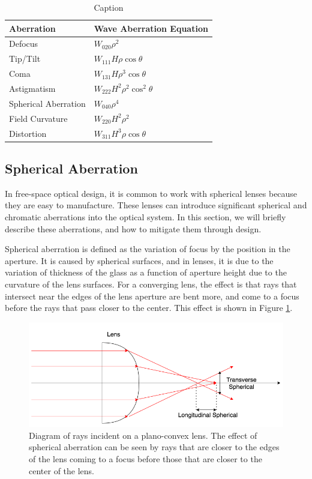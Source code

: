 \begin{table}
	\begin{center}
		\begin{tabular}{ | l| l | }
			\hline
			\textbf{Aberration}& \textbf{Wave Aberration Equation} \\ \hline
			Defocus & $W_{020}\rho^2$\\ \hline
			Tip/Tilt & $W_{111}H\rho \cos\theta$ \\ \hline
			Coma & $W_{131}H\rho^3\cos\theta$  \\ \hline
			Astigmatism & $W_{222}H^2\rho^2\cos^2\theta$  \\ \hline
			Spherical Aberration & $W_{040}\rho^4$ \\ \hline
			Field Curvature & $W_{220}H^2\rho^2$ \\ \hline
			Distortion & $W_{311}H^3 \rho \cos\theta$ \\ \hline
				
		\end{tabular}
	\end{center}
	\caption{Caption}
	\label{tab:aberrations}
\end{table}



\subsection{Spherical Aberration}

In free-space optical design, it is common to work with spherical lenses because they are easy to manufacture. These lenses can introduce significant spherical and chromatic aberrations into the optical system. In this section, we will briefly describe these aberrations, and how to mitigate them through design.  

Spherical aberration is defined as the variation of focus by the position in the aperture. It is caused by spherical surfaces, and in lenses, it is due to the variation of thickness of the glass as a function of aperture height due to the curvature of the lens surfaces. For a converging lens, the effect is that rays that intersect near the edges of the lens aperture are bent more, and come to a focus before the rays that pass closer to the center. This effect is shown in Figure \ref{fig:spherical}. 

\begin{figure}
    \centering
    \includegraphics[width=.8\textwidth]{Chapter Materials/Chapter Three Materials/spherical.png}
    \caption{Diagram of rays incident on a plano-convex lens. The effect of spherical aberration can be seen by rays that are closer to the edges of the lens coming to a focus before those that are closer to the center of the lens. }
    \label{fig:spherical}
\end{figure}

